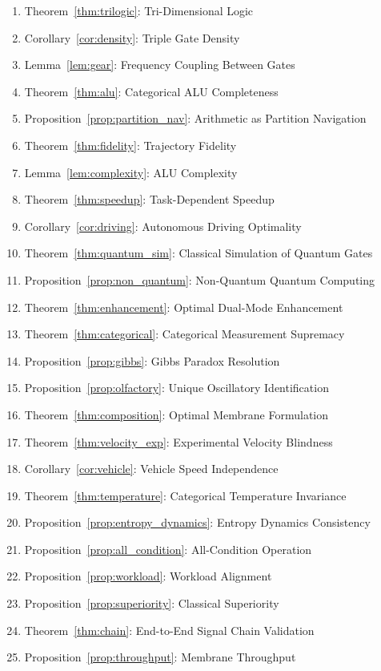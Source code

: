 \documentclass[twocolumn,10pt,a4paper]{article}
\theoremstyle{definition}
\theoremstyle{remark}
\begin{document}
\begin{enumerate}
    \item Theorem~\ref{thm:trilogic}: Tri-Dimensional Logic
    \item Corollary~\ref{cor:density}: Triple Gate Density
    \item Lemma~\ref{lem:gear}: Frequency Coupling Between Gates
    \item Theorem~\ref{thm:alu}: Categorical ALU Completeness
    \item Proposition~\ref{prop:partition_nav}: Arithmetic as Partition Navigation
    \item Theorem~\ref{thm:fidelity}: Trajectory Fidelity
    \item Lemma~\ref{lem:complexity}: ALU Complexity
    \item Theorem~\ref{thm:speedup}: Task-Dependent Speedup
    \item Corollary~\ref{cor:driving}: Autonomous Driving Optimality
    \item Theorem~\ref{thm:quantum_sim}: Classical Simulation of Quantum Gates
    \item Proposition~\ref{prop:non_quantum}: Non-Quantum Quantum Computing
    \item Theorem~\ref{thm:enhancement}: Optimal Dual-Mode Enhancement
    \item Theorem~\ref{thm:categorical}: Categorical Measurement Supremacy
    \item Proposition~\ref{prop:gibbs}: Gibbs Paradox Resolution
    \item Proposition~\ref{prop:olfactory}: Unique Oscillatory Identification
    \item Theorem~\ref{thm:composition}: Optimal Membrane Formulation
    \item Theorem~\ref{thm:velocity_exp}: Experimental Velocity Blindness
    \item Corollary~\ref{cor:vehicle}: Vehicle Speed Independence
    \item Theorem~\ref{thm:temperature}: Categorical Temperature Invariance
    \item Proposition~\ref{prop:entropy_dynamics}: Entropy Dynamics Consistency
    \item Proposition~\ref{prop:all_condition}: All-Condition Operation
    \item Proposition~\ref{prop:workload}: Workload Alignment
    \item Proposition~\ref{prop:superiority}: Classical Superiority
    \item Theorem~\ref{thm:chain}: End-to-End Signal Chain Validation
    \item Proposition~\ref{prop:throughput}: Membrane Throughput
\end{enumerate}
\end{document}
